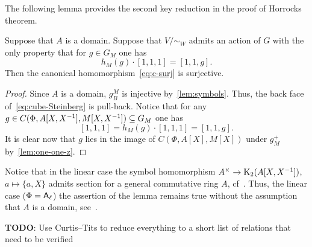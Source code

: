 The following lemma provides the second key reduction in the proof of Horrocks theorem.
\begin{lemma}
    Suppose that $A$ is a domain.
    Suppose that $V/\sim_W$ admits an action of $G$ with the only property that
      for $g \in G_M$ one has \[ h_M(g) \cdot [1, 1, 1] = [1, 1, g]. \]
    Then the canonical homomorphism~\eqref{eq:c-surj} is surjective.
\end{lemma}
\begin{proof}
  Since $A$ is a domain, $g^M_B$ is injective by~\cref{lem:symbols}.
    Thus, the back face of~\eqref{eq:cube-Steinberg} is pull-back.
  Notice that for any $g \in C(\Phi, A[X, X^{-1}], M[X, X^{-1}]) \subseteq G_M$ one has
    \[ [1, 1, 1] = h_M(g) \cdot [1, 1, 1] = [1, 1, g].\]
  It is clear now that $g$ lies in the image of $C(\Phi, A[X], M[X])$ under $g^+_M$ by~\cref{lem:one-one-z}.
\end{proof}

\begin{rem}
    Notice that in the linear case the symbol homomorphism $A^\times \to \operatorname{K}_2(A[X, X^{-1}])$, $a \mapsto \{a, X\}$ admits section
     for a general commutative ring $A$, cf~\cite{Wa71}.
    Thus, the linear case ($\Phi = \mathsf{A}_\ell$) the assertion of the lemma remains true without the assumption that $A$ is a domain, see~\cite[Lemma~3.1g]{Tu83}.
\end{rem}

\textbf{TODO}: Use Curtis--Tits to reduce everything to a short list of relations that need to be verified


